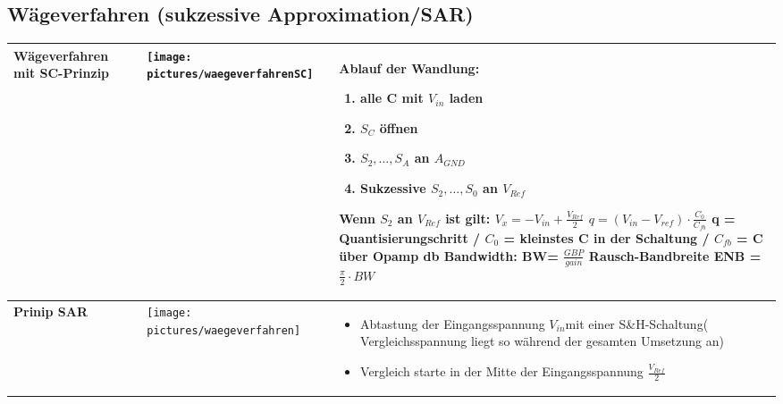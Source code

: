 \subsection{Wägeverfahren (sukzessive Approximation/SAR) }
\begin{longtable}{|>{\bfseries}p{4cm}|p{6cm}|p{8cm}|}
  \hline
      Wägeverfahren mit SC-Prinzip &
      \texttt{[image: pictures/waegeverfahrenSC]} &
      \textbf{Ablauf der Wandlung:}
      \begin{enumerate}
        \item alle C mit $V_{in}$ laden
        \item $S_C$ öffnen
        \item $S_2, \ldots, S_A$ an $A_{GND}$
        \item Sukzessive $S_2, \ldots, S_0$ an $V_{Ref}$
      \end{enumerate}
      Wenn $S_2$ an $V_{Ref}$ ist gilt: $V_x = -V_{in}+\frac{V_{Ref}}{2}$ \newline 
      $q=(V_{in}-V_{ref})\cdot \frac{C_0}{C_{fb}} $ \newline q = Quantisierungschritt / $C_0$ = kleinstes C in der Schaltung / $C_{fb}$ = C über Opamp \newline 3 db Bandwidth: BW= $\frac{GBP}{gain}$ \newline
      Rausch-Bandbreite ENB = $\frac{\pi}{2} \cdot BW$
      
      \\
    \hline
    
    Prinip SAR &
    \texttt{[image: pictures/waegeverfahren]} &
    \begin{itemize}
      \item Abtastung der Eingangsspannung $V_{in}$mit einer
          S\&H-Schaltung( Vergleichsspannung liegt so während der gesamten
        Umsetzung an)
      \item Vergleich starte in der Mitte der Eingangsspannung $\frac{V_{Ref}}{2}$
    \end{itemize} \\
    

\end{longtable}
